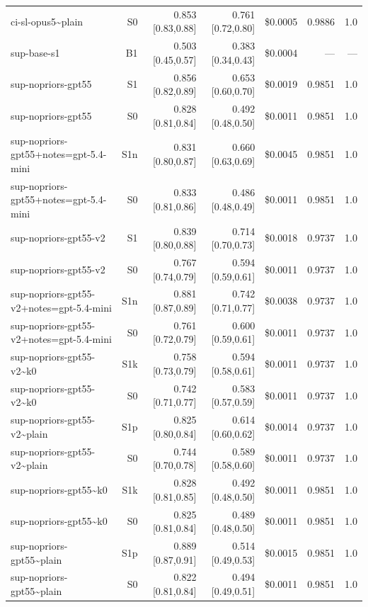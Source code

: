 \documentclass[11pt]{article}
\begin{document}
{\begin{longtable}{lrrrrrr}
ci-sl-opus5\textasciitilde{}plain & S0 & 0.853 [0.83,0.88] & 0.761 [0.72,0.80] & \$0.0005 & 0.9886 & 1.0 \\
sup-base-s1 & B1 & 0.503 [0.45,0.57] & 0.383 [0.34,0.43] & \$0.0004 & --- & --- \\
sup-nopriors-gpt55 & S1 & 0.856 [0.82,0.89] & 0.653 [0.60,0.70] & \$0.0019 & 0.9851 & 1.0 \\
sup-nopriors-gpt55 & S0 & 0.828 [0.81,0.84] & 0.492 [0.48,0.50] & \$0.0011 & 0.9851 & 1.0 \\
sup-nopriors-gpt55+notes=gpt-5.4-mini & S1n & 0.831 [0.80,0.87] & 0.660 [0.63,0.69] & \$0.0045 & 0.9851 & 1.0 \\
sup-nopriors-gpt55+notes=gpt-5.4-mini & S0 & 0.833 [0.81,0.86] & 0.486 [0.48,0.49] & \$0.0011 & 0.9851 & 1.0 \\
sup-nopriors-gpt55-v2 & S1 & 0.839 [0.80,0.88] & 0.714 [0.70,0.73] & \$0.0018 & 0.9737 & 1.0 \\
sup-nopriors-gpt55-v2 & S0 & 0.767 [0.74,0.79] & 0.594 [0.59,0.61] & \$0.0011 & 0.9737 & 1.0 \\
sup-nopriors-gpt55-v2+notes=gpt-5.4-mini & S1n & 0.881 [0.87,0.89] & 0.742 [0.71,0.77] & \$0.0038 & 0.9737 & 1.0 \\
sup-nopriors-gpt55-v2+notes=gpt-5.4-mini & S0 & 0.761 [0.72,0.79] & 0.600 [0.59,0.61] & \$0.0011 & 0.9737 & 1.0 \\
sup-nopriors-gpt55-v2\textasciitilde{}k0 & S1k & 0.758 [0.73,0.79] & 0.594 [0.58,0.61] & \$0.0011 & 0.9737 & 1.0 \\
sup-nopriors-gpt55-v2\textasciitilde{}k0 & S0 & 0.742 [0.71,0.77] & 0.583 [0.57,0.59] & \$0.0011 & 0.9737 & 1.0 \\
sup-nopriors-gpt55-v2\textasciitilde{}plain & S1p & 0.825 [0.80,0.84] & 0.614 [0.60,0.62] & \$0.0014 & 0.9737 & 1.0 \\
sup-nopriors-gpt55-v2\textasciitilde{}plain & S0 & 0.744 [0.70,0.78] & 0.589 [0.58,0.60] & \$0.0011 & 0.9737 & 1.0 \\
sup-nopriors-gpt55\textasciitilde{}k0 & S1k & 0.828 [0.81,0.85] & 0.492 [0.48,0.50] & \$0.0011 & 0.9851 & 1.0 \\
sup-nopriors-gpt55\textasciitilde{}k0 & S0 & 0.825 [0.81,0.84] & 0.489 [0.48,0.50] & \$0.0011 & 0.9851 & 1.0 \\
sup-nopriors-gpt55\textasciitilde{}plain & S1p & 0.889 [0.87,0.91] & 0.514 [0.49,0.53] & \$0.0015 & 0.9851 & 1.0 \\
sup-nopriors-gpt55\textasciitilde{}plain & S0 & 0.822 [0.81,0.84] & 0.494 [0.49,0.51] & \$0.0011 & 0.9851 & 1.0 \\

\end{longtable}}
\end{document}
